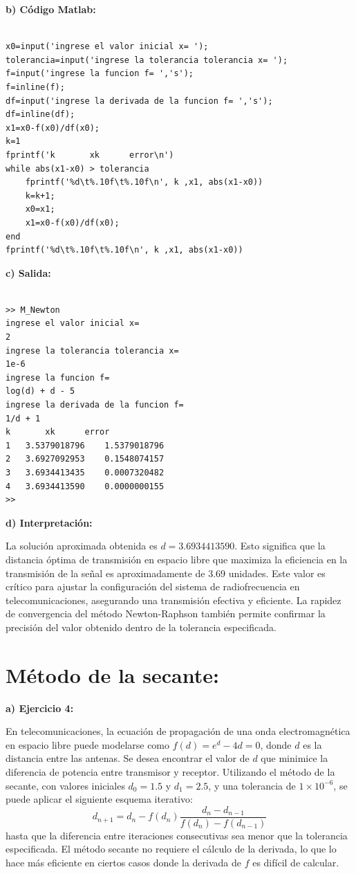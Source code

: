 \documentclass[12pt,a4paper,twoside]{article}  %
\begin{document}
\textbf{b) Código Matlab:}

\begin{lstlisting}

x0=input('ingrese el valor inicial x= ');
tolerancia=input('ingrese la tolerancia tolerancia x= ');
f=input('ingrese la funcion f= ','s');
f=inline(f);
df=input('ingrese la derivada de la funcion f= ','s');
df=inline(df);
x1=x0-f(x0)/df(x0);
k=1
fprintf('k       xk      error\n')
while abs(x1-x0) > tolerancia
    fprintf('%d\t%.10f\t%.10f\n', k ,x1, abs(x1-x0))
    k=k+1;
    x0=x1;
    x1=x0-f(x0)/df(x0);
end
fprintf('%d\t%.10f\t%.10f\n', k ,x1, abs(x1-x0))

\end{lstlisting}

\textbf{c) Salida:}

\begin{verbatim}

>> M_Newton
ingrese el valor inicial x= 
2
ingrese la tolerancia tolerancia x= 
1e-6
ingrese la funcion f= 
log(d) + d - 5
ingrese la derivada de la funcion f= 
1/d + 1
k       xk      error
1	3.5379018796	1.5379018796
2	3.6927092953	0.1548074157
3	3.6934413435	0.0007320482
4	3.6934413590	0.0000000155
>> 

\end{verbatim}

\textbf{d) Interpretación:}

La solución aproximada obtenida es \( d = 3.6934413590 \). Esto significa que la distancia óptima de transmisión en espacio libre que maximiza la eficiencia en la transmisión de la señal es aproximadamente de 3.69 unidades. Este valor es crítico para ajustar la configuración del sistema de radiofrecuencia en telecomunicaciones, asegurando una transmisión efectiva y eficiente. La rapidez de convergencia del método Newton-Raphson también permite confirmar la precisión del valor obtenido dentro de la tolerancia especificada.



\section{Método de la secante: }

\textbf{a) Ejercicio 4: }

En telecomunicaciones, la ecuación de propagación de una onda electromagnética en espacio libre puede modelarse como \( f(d) = e^d - 4d = 0 \), donde \( d \) es la distancia entre las antenas. Se desea encontrar el valor de \( d \) que minimice la diferencia de potencia entre transmisor y receptor. Utilizando el método de la secante, con valores iniciales \( d_0 = 1.5 \) y \( d_1 = 2.5 \), y una tolerancia de \( 1 \times 10^{-6} \), se puede aplicar el siguiente esquema iterativo:
\[
d_{n+1} = d_n - f(d_n) \frac{d_n - d_{n-1}}{f(d_n) - f(d_{n-1})}
\]
hasta que la diferencia entre iteraciones consecutivas sea menor que la tolerancia especificada. El método secante no requiere el cálculo de la derivada, lo que lo hace más eficiente en ciertos casos donde la derivada de \( f \) es difícil de calcular.
\end{document}
